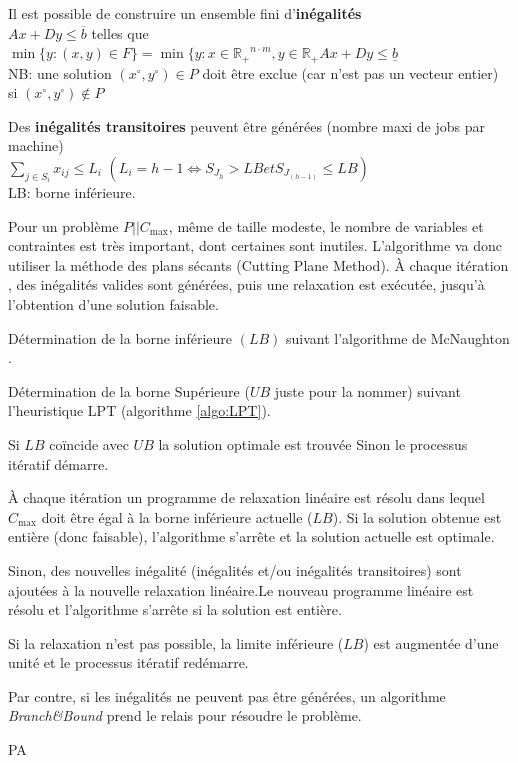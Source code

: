 \documentclass[a4paper,12pt]{report}
\theoremstyle{plain}				%
\theoremstyle{definition}				%
\newcommand\problemGrahamP{$P||C_{\max}$\xspace}
\begin{document}
Il est possible de construire un ensemble fini d'\textbf{inégalités} \\
$Ax+Dy \leq \overline{b}$ telles que \\
$\min \{y : (x,y) \in F \} = \min \{y : x \in \mathbb{R_+}^{n \cdot m}, y \in \mathbb{R_+} Ax+Dy \leq \underline{b}$ \\
NB: une solution
$(x \ensuremath{^\circ} , y\ensuremath{^\circ}) \in P$ doit être
exclue (car n'est pas un vecteur entier) si
$(x\ensuremath{^\circ}, y\ensuremath{^\circ}) \notin P $

\bigskip
Des \textbf{inégalités transitoires} peuvent être générées (nombre maxi de jobs par machine) \\
$\sum_{j \in S_i} x_{ij} \leq L_i$ \quad $(L_i = h-1 \iff S_{J_h} > LB et S_{J_{(h-1)}} \leq LB)$\\
LB: borne inférieure.

\bigskip

Pour un problème \problemGrahamP, même de taille modeste, le nombre de
variables et contraintes est très important, dont certaines sont
inutiles.
L'algorithme va donc utiliser la méthode des plans sécants (Cutting
Plane Method).
\`A chaque itération , des inégalités valides sont générées, puis une
relaxation est exécutée, jusqu'à l'obtention d'une solution faisable.

\bigskip
\begin{algorithm}[H]
\DontPrintSemicolon

Détermination de la borne inférieure $(LB)$ suivant l'algorithme de
McNaughton \cite{mcnaughton1959scheduling}.

\BlankLine %
Détermination de la borne Supérieure ($UB$ juste pour la nommer)
suivant l'heuristique LPT (algorithme \ref{algo:LPT}).

\BlankLine %
Si $LB$ coïncide avec $UB$ la solution optimale est trouvée Sinon le
processus itératif démarre.

\BlankLine
À chaque itération un programme de relaxation linéaire est résolu dans
lequel $C_{\max}$ doit être égal à la borne inférieure actuelle
($LB$).
Si la solution obtenue est entière (donc faisable), l'algorithme
s'arrête et la solution actuelle est optimale.

\BlankLine
Sinon, des nouvelles inégalité (inégalités et/ou inégalités
transitoires) sont ajoutées à la nouvelle relaxation linéaire.Le
nouveau programme linéaire est résolu et l'algorithme s'arrête si la
solution est entière.

\BlankLine
Si la relaxation n'est pas possible, la limite inférieure ($LB$) est
augmentée d'une unité et le processus itératif redémarre.

\BlankLine
Par contre, si les inégalités ne peuvent pas être générées, un
algorithme \emph{Branch\&Bound} prend le relais pour résoudre le
problème.

\caption{PA\label{algo:PA}}
\end{algorithm}
\end{document}
